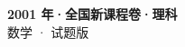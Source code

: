 \documentclass[zihao=-4, a4paper]{ctexart}
\begin{document}
\begin{center}
  {\Large\bfseries 2001 年·全国新课程卷·理科}\\[4pt]
  {\large 数学 · 试题版}
\end{center}
\medskip
{}

\end{document}
